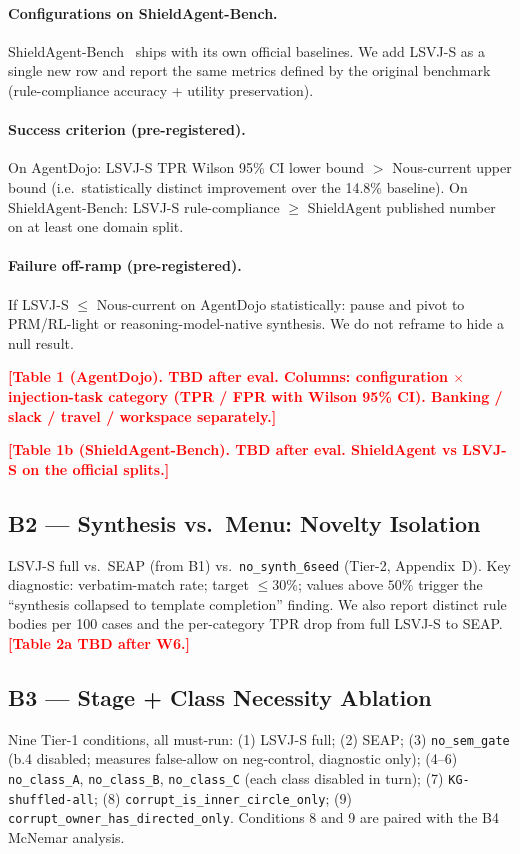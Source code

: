 \documentclass{article}
\theoremstyle{definition}
\newcommand{\placeholder}[1]{\textcolor{red}{\textbf{[#1]}}}
\begin{document}
\paragraph{Configurations on ShieldAgent-Bench.}
ShieldAgent-Bench~\citep{chen2025shieldagent} ships with its own
official baselines. We add LSVJ-S as a single new row and report
the same metrics defined by the original benchmark
(rule-compliance accuracy + utility preservation).

\paragraph{Success criterion (pre-registered).}
On AgentDojo: LSVJ-S TPR Wilson 95\% CI lower bound $>$ Nous-current
upper bound (i.e.\ statistically distinct improvement over the
14.8\% baseline). On ShieldAgent-Bench: LSVJ-S rule-compliance
$\ge$ ShieldAgent published number on at least one domain split.

\paragraph{Failure off-ramp (pre-registered).}
If LSVJ-S $\le$ Nous-current on AgentDojo statistically: pause and
pivot to PRM/RL-light or reasoning-model-native synthesis. We do
not reframe to hide a null result.

\placeholder{Table 1 (AgentDojo). TBD after eval. Columns:
configuration $\times$ injection-task category (TPR / FPR with
Wilson 95\% CI). Banking / slack / travel / workspace separately.}

\placeholder{Table 1b (ShieldAgent-Bench). TBD after eval.
ShieldAgent vs LSVJ-S on the official splits.}

\subsection{B2 --- Synthesis vs.\ Menu: Novelty Isolation}
\label{sec:exp:b2}
LSVJ-S full vs.\ SEAP (from B1) vs.\ \texttt{no\_synth\_6seed}
(Tier-2, Appendix~D). Key diagnostic: verbatim-match rate;
target $\le 30\%$; values above $50\%$ trigger the ``synthesis
collapsed to template completion'' finding. We also report distinct
rule bodies per 100 cases and the per-category TPR drop from full
LSVJ-S to SEAP. \placeholder{Table 2a TBD after W6.}

\subsection{B3 --- Stage + Class Necessity Ablation}
\label{sec:exp:b3}
Nine Tier-1 conditions, all must-run:
(1) LSVJ-S full;
(2) SEAP;
(3) \texttt{no\_sem\_gate} (b.4 disabled; measures false-allow on
neg-control, diagnostic only);
(4--6) \texttt{no\_class\_A}, \texttt{no\_class\_B},
\texttt{no\_class\_C} (each class disabled in turn);
(7) \texttt{KG-shuffled-all};
(8) \texttt{corrupt\_is\_inner\_circle\_only};
(9) \texttt{corrupt\_owner\_has\_directed\_only}.
Conditions 8 and 9 are paired with the B4 McNemar analysis.
\end{document}
